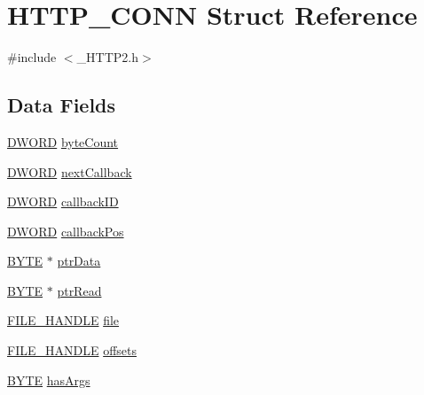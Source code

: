 \hypertarget{struct_h_t_t_p___c_o_n_n}{}\section{H\+T\+T\+P\+\_\+\+C\+O\+N\+N Struct Reference}
\label{struct_h_t_t_p___c_o_n_n}


{\ttfamily \#include $<$\+\_\+\+H\+T\+T\+P2.\+h$>$}

\subsection*{Data Fields}
\begin{DoxyCompactItemize}
\item 
\hyperlink{_generic_type_defs_8h_ad342ac907eb044443153a22f964bf0af}{D\+W\+O\+R\+D} \hyperlink{struct_h_t_t_p___c_o_n_n_aa02a3d23a030e9524e25decbb213db08}{byte\+Count}
\item 
\hyperlink{_generic_type_defs_8h_ad342ac907eb044443153a22f964bf0af}{D\+W\+O\+R\+D} \hyperlink{struct_h_t_t_p___c_o_n_n_aac8828c64149aa2ceb3fa45fffe5dee8}{next\+Callback}
\item 
\hyperlink{_generic_type_defs_8h_ad342ac907eb044443153a22f964bf0af}{D\+W\+O\+R\+D} \hyperlink{struct_h_t_t_p___c_o_n_n_a5bd816e738bd3e57c98db6c81a47750a}{callback\+I\+D}
\item 
\hyperlink{_generic_type_defs_8h_ad342ac907eb044443153a22f964bf0af}{D\+W\+O\+R\+D} \hyperlink{struct_h_t_t_p___c_o_n_n_a9c5c499daa5e0edb7523c8a0ff7fb3a5}{callback\+Pos}
\item 
\hyperlink{_generic_type_defs_8h_a4ae1dab0fb4b072a66584546209e7d58}{B\+Y\+T\+E} $\ast$ \hyperlink{struct_h_t_t_p___c_o_n_n_a18c16d16b06a76902bdf3e60b1367369}{ptr\+Data}
\item 
\hyperlink{_generic_type_defs_8h_a4ae1dab0fb4b072a66584546209e7d58}{B\+Y\+T\+E} $\ast$ \hyperlink{struct_h_t_t_p___c_o_n_n_a8e43a11f6094f838f219bacc830ee9b4}{ptr\+Read}
\item 
\hyperlink{_file_system_8h_aa6fe575be33545bfca2bc621a027dd40}{F\+I\+L\+E\+\_\+\+H\+A\+N\+D\+L\+E} \hyperlink{struct_h_t_t_p___c_o_n_n_ac2ad94560a4310ff5ef4ce69076ad7cf}{file}
\item 
\hyperlink{_file_system_8h_aa6fe575be33545bfca2bc621a027dd40}{F\+I\+L\+E\+\_\+\+H\+A\+N\+D\+L\+E} \hyperlink{struct_h_t_t_p___c_o_n_n_abf0503ef5f942f9227ac2c1df6fb9ffb}{offsets}
\item 
\hyperlink{_generic_type_defs_8h_a4ae1dab0fb4b072a66584546209e7d58}{B\+Y\+T\+E} \hyperlink{struct_h_t_t_p___c_o_n_n_a7c2d9b48c207d7dfdff2616b0664b00c}{has\+Args}

\end{DoxyCompactItemize}
